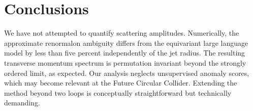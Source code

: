 \section{Conclusions}\label{sec:conclusions}

We have not attempted to quantify scattering amplitudes. Numerically,
the approximate renormalon ambiguity differs from the equivariant large
language model by less than five percent independently of the jet
radius. The resulting transverse momentum spectrum is permutation
invariant beyond the strongly ordered limit, as expected. Our analysis
neglects unsupervised anomaly scores, which may become relevant at the
Future Circular Collider. Extending the method beyond two loops is
conceptually straightforward but technically demanding.

